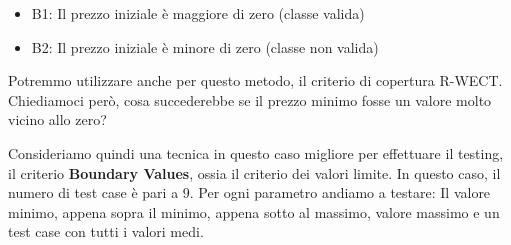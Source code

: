 \begin{itemize}
	\item B1: Il prezzo iniziale è maggiore di zero (classe valida)
	\item B2: Il prezzo iniziale è minore di zero (classe non valida)
\end{itemize}\medskip

\noindent
Potremmo utilizzare anche per questo metodo, il criterio di copertura R-WECT. Chiediamoci però, cosa succederebbe se il prezzo minimo fosse un valore molto vicino allo zero?

Consideriamo quindi una tecnica in questo caso migliore per effettuare il testing, il criterio \textbf{Boundary Values}, ossia il criterio dei valori limite. In questo caso, il numero di test case è pari a 9.\meskip
Per ogni parametro andiamo a testare: Il valore minimo, appena sopra il minimo, appena sotto al massimo, valore massimo e un test case con tutti i valori medi.

